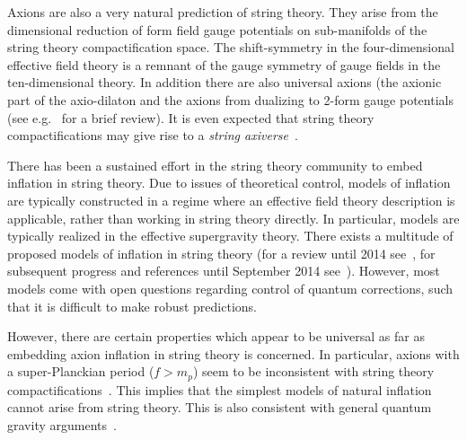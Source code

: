 Axions are also a very natural prediction of string theory. They arise from the dimensional reduction of form field gauge potentials on sub-manifolds of the string theory compactification space. The shift-symmetry in the four-dimensional effective field theory is a remnant of the gauge symmetry of gauge fields in the ten-dimensional theory. In addition there are also universal axions (the axionic part of the axio-dilaton and the axions from dualizing to 2-form gauge potentials (see e.g.~\cite{1404.2601} for a brief review). It is even expected that string theory compactifications may give rise to a \textit{string axiverse}~\cite{Arvanitaki:2009fg, Cicoli:2012sz}. 

There has been a sustained effort in the string theory community to embed inflation in string theory. Due to issues of theoretical control, models of inflation are typically constructed in a regime where an effective field theory description is applicable, rather than working in string theory directly. In particular, models are typically realized in the effective supergravity theory. There exists a multitude of proposed models of inflation in string theory (for a review until 2014 see~\cite{1404.2601}, for subsequent progress and references until September 2014 see~\cite{1409.5350}). However, most models come with open questions regarding control of quantum corrections, such that it is difficult to make robust predictions.

However, there are certain properties which appear to be universal as far as embedding axion inflation in string theory is concerned. In particular, axions with a super-Planckian period ($f > m_p$) seem to be inconsistent with string theory compactifications~\cite{0605206}. This implies that the simplest models of natural inflation cannot arise from string theory. This is also consistent with general quantum gravity arguments~\cite{ArkaniHamed:2006dz, Conlon:2012tz}.

